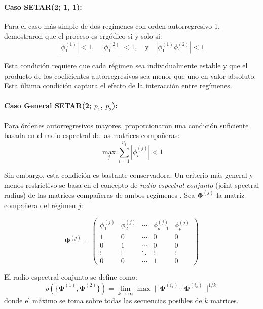 \paragraph{Caso SETAR(2; 1, 1):} Para el caso más simple de dos regímenes con orden autorregresivo 1, \textcite{petruccelli1984consistent} demostraron que el proceso es ergódico si y solo si:
\begin{equation}
|\phi_1^{(1)}| < 1, \quad |\phi_1^{(2)}| < 1, \quad \text{y} \quad |\phi_1^{(1)} \phi_1^{(2)}| < 1
\label{eq:setar11_stationarity}
\end{equation}

Esta condición requiere que cada régimen sea individualmente estable y que el producto de los coeficientes autorregresivos sea menor que uno en valor absoluto. Esta última condición captura el efecto de la interacción entre regímenes.

\paragraph{\texorpdfstring{Caso General SETAR(2; $p_1$, $p_2$):}{Caso General SETAR(2; p1, p2):}} Para órdenes autorregresivos mayores,\textcite{chan1985testing} proporcionaron una condición suficiente basada en el radio espectral de las matrices compañeras:
\begin{equation}
\max_j \sum_{i=1}^{p_j} |\phi_i^{(j)}| < 1
\label{eq:setar_sufficient_condition}
\end{equation}

Sin embargo, esta condición es bastante conservadora. Un criterio más general y menos restrictivo se basa en el concepto de \textit{radio espectral conjunto} (joint spectral radius) de las matrices compañeras de ambos regímenes \parencite{Chen2023}. Sea $\boldsymbol{\Phi}^{(j)}$ la matriz compañera del régimen $j$:

\begin{equation}
\boldsymbol{\Phi}^{(j)} = 
\begin{pmatrix}
\phi_1^{(j)} & \phi_2^{(j)} & \cdots & \phi_{p-1}^{(j)} & \phi_p^{(j)} \\
1 & 0 & \cdots & 0 & 0 \\
0 & 1 & \cdots & 0 & 0 \\
\vdots & \vdots & \ddots & \vdots & \vdots \\
0 & 0 & \cdots & 1 & 0
\end{pmatrix}
\end{equation}

El radio espectral conjunto se define como:
\begin{equation}
\rho(\{\boldsymbol{\Phi}^{(1)}, \boldsymbol{\Phi}^{(2)}\}) = \lim_{k \to \infty} \max \|\boldsymbol{\Phi}^{(i_1)} \cdots \boldsymbol{\Phi}^{(i_k)}\|^{1/k}
\end{equation}
donde el máximo se toma sobre todas las secuencias posibles de $k$ matrices.

